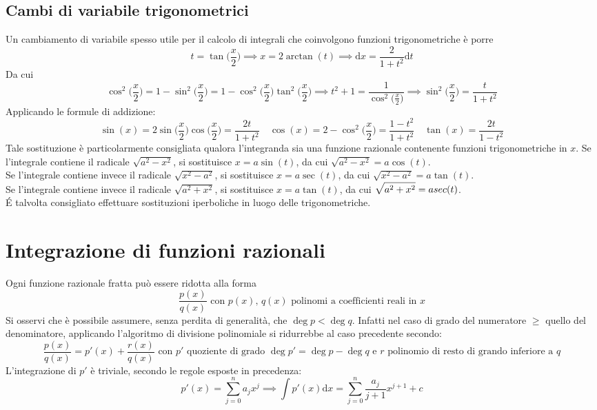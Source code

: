 \documentclass[10pt, oneside]{book}
\theoremstyle{plain}
\begin{document}
\subsection{Cambi di variabile trigonometrici}
Un cambiamento di variabile spesso utile per il calcolo di integrali che coinvolgono funzioni trigonometriche è porre
\[t = \tan\big(\frac{x}{2}\big) \implies x = 2 \arctan (t) \implies \textrm{d}x = \frac{2}{1+t^2}\textrm{d}t\]
Da cui
\[\cos^2\big(\frac{x}{2}\big) = 1 - \sin^2\big(\frac{x}{2}\big) = 1 - \cos^2\big(\frac{x}{2}\big) \tan^2\big(\frac{x}{2}\big) \implies t^2 + 1 = \frac{1}{\cos^2\big(\frac{x}{2}\big)} \implies \sin^2\big(\frac{x}{2}\big) = \frac{t}{1+t^2}\]
Applicando le formule di addizione:
\[\sin(x) = 2 \sin\big(\frac{x}{2}\big) \cos\big(\frac{x}{2}\big) = \frac{2t}{1+t^2} \quad \cos(x) = 2 - \cos^2\big(\frac{x}{2}\big) = \frac{1 - t^2}{1+t^2} \quad \tan(x) = \frac{2t}{1 - t^2}\]
Tale sostituzione è particolarmente consigliata qualora l'integranda sia una funzione razionale contenente funzioni trigonometriche in $x$.
Se l'integrale contiene il radicale $\displaystyle \sqrt{a^2 - x^2}$, si sostituisce $x = a \sin(t)$, da cui $\displaystyle \sqrt{a^2 - x^2} = a \cos(t)$.
\\Se l'integrale contiene invece il radicale $\displaystyle \sqrt{x^2 - a^2}$, si sostituisce $x = a \sec(t)$, da cui $\displaystyle \sqrt{x^2 - a^2} = a \tan(t)$.
\\Se l'integrale contiene invece il radicale $\displaystyle \sqrt{a^2 + x^2}$, si sostituisce $x = a \tan(t)$, da cui $\displaystyle \sqrt{a^2 + x^2} = a \\sec(t)$.
\\\'E talvolta consigliato effettuare sostituzioni iperboliche in luogo delle trigonometriche.


\section{Integrazione di funzioni razionali}
Ogni funzione razionale fratta può essere ridotta alla forma
\[\frac{p(x)}{q(x)} \textrm{  con $p(x)$, $q(x)$ polinomi a coefficienti reali in $x$}\]
Si osservi che è possibile assumere, senza perdita di generalità, che $\deg p < \deg q$. Infatti nel caso di grado del numeratore $\geq$ quello del denominatore, applicando l'algoritmo di divisione polinomiale si ridurrebbe al caso precedente secondo:
\[\frac{p(x)}{q(x)} = p'(x) + \frac{r(x)}{q(x)} \textrm{ con $p'$ quoziente di grado $\deg p' = \deg p - \deg q$ e $r$ polinomio di resto di grando inferiore a $q$}\]
L'integrazione di $p'$ è triviale, secondo le regole esposte in precedenza:
\[p'(x) = \sum \limits_{j=0}^{n}a_j x^j \implies \int p'(x) \textrm{d}x = \sum \limits_{j=0}^{n}\frac{a_j}{j+1} 
 x^{j+1} + c\]
\end{document}
